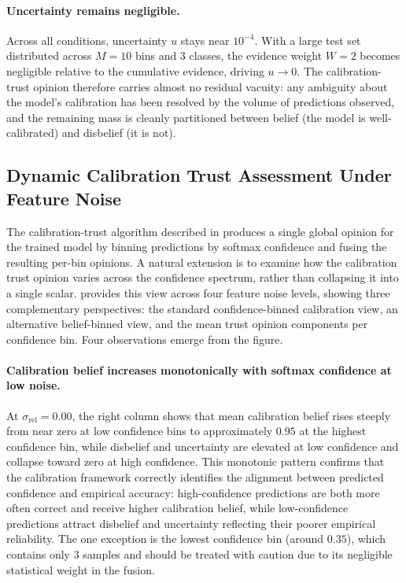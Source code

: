 \paragraph{Uncertainty remains negligible.}
Across all conditions, uncertainty $u$ stays near $10^{-4}$. With a large test set distributed across $M = 10$ bins and 3 classes, the evidence weight $W = 2$ becomes negligible relative to the cumulative evidence, driving $u \to 0$. The calibration-trust opinion therefore carries almost no residual vacuity: any ambiguity about the model's calibration has been resolved by the volume of predictions observed, and the remaining mass is cleanly partitioned between belief (the model is well-calibrated) and disbelief (it is not).

\subsection{Dynamic Calibration Trust Assessment Under Feature Noise}
The calibration-trust algorithm described in  produces a single global opinion for the trained model by binning predictions by softmax confidence and fusing the resulting per-bin opinions. A natural extension is to examine how the calibration trust opinion varies across the confidence spectrum, rather than collapsing it into a single scalar.  provides this view across four feature noise levels, showing three complementary perspectives: the standard confidence-binned calibration view, an alternative belief-binned view, and the mean trust opinion components per confidence bin. Four observations emerge from the figure.

\paragraph{Calibration belief increases monotonically with softmax confidence 
at low noise.}At $\sigma_{\text{rel}} = 0.00$, the right column shows that mean calibration belief rises steeply from near zero at low confidence bins to approximately $0.95$ at the highest confidence bin, while disbelief and uncertainty are elevated at low confidence and collapse toward zero at high confidence. This monotonic pattern confirms that the calibration framework correctly identifies the alignment between predicted confidence and empirical accuracy: high-confidence predictions are both more often correct and receive higher calibration belief, while low-confidence predictions attract disbelief and uncertainty reflecting their poorer empirical reliability. The one exception is the lowest confidence bin (around $0.35$), which contains only 3 samples and should be treated with caution due to its negligible statistical weight in the fusion.

